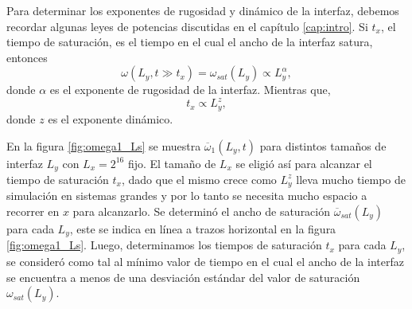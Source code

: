 


Para determinar los exponentes de rugosidad y dinámico de la interfaz, debemos recordar algunas leyes de potencias discutidas en el capítulo \ref{cap:intro}. Si $t_x$, el tiempo de saturación, es el tiempo en el cual el ancho de la interfaz satura, entonces
\begin{equation}
    \omega(L_y,t \gg t_x) = \omega_{sat}(L_y) \propto L_y^{\alpha},
    \label{eq:omega_sat}
\end{equation}
donde $\alpha$ es el exponente de rugosidad de la interfaz. Mientras que,
\begin{equation}
    t_x \propto L_y^z,
    \label{eq:t_x}
\end{equation}
donde $z$ es el exponente dinámico.

En la figura \ref{fig:omega1_Ls} se muestra $\overline{\omega}_1(L_y,t)$ para distintos tamaños de interfaz $L_y$ con $L_x = 2^{16}$ fijo. El tamaño de $L_x$ se eligió así para alcanzar el tiempo de saturación $t_x$, dado que el mismo crece como $L^z_y$ lleva mucho tiempo de simulación en sistemas grandes y por lo tanto se necesita mucho espacio a recorrer en $x$ para alcanzarlo. Se determinó el ancho de saturación $\overline{\omega}_{sat}(L_y)$ para cada $L_y$, este se indica en línea a trazos horizontal en la figura \ref{fig:omega1_Ls}. Luego, determinamos los tiempos de saturación $t_x$ para cada $L_y$, se consideró como tal al mínimo valor de tiempo en el cual el ancho de la interfaz se encuentra a menos de una desviación estándar del valor de saturación $\omega_{sat}(L_y)$.

